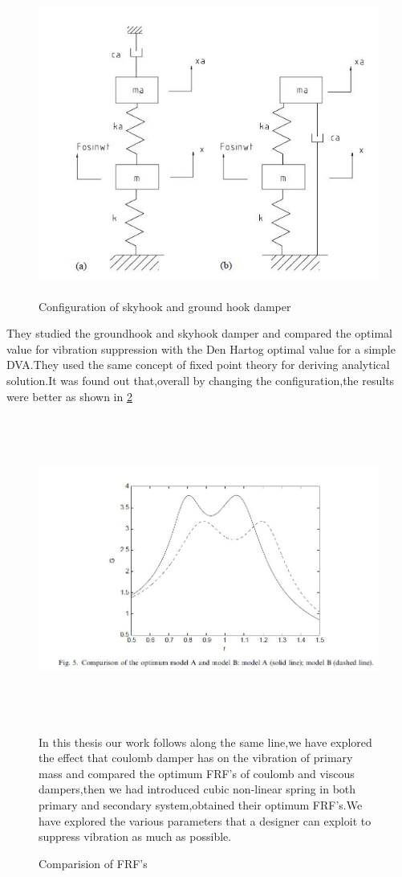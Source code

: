 \begin{figure}[h!]
\includegraphics[width=16cm,height=10cm]{"figures/8"}
\caption{Configuration of skyhook and ground hook damper}
  \label{fig:8}
\end{figure}
They studied the groundhook and skyhook damper and compared the optimal value for vibration suppression with the Den Hartog optimal value for a simple DVA.They used the same concept of fixed point theory for deriving analytical solution.It was found out that,overall by changing the configuration,the results were better as shown in \ref{fig:9}
\begin{figure}[h!]
\includegraphics[width=16cm,height=10cm]{"figures/9"}
\caption{Comparision of FRF's}
  \label{fig:9}
  In this thesis our work follows along the same line,we have explored the effect that coulomb damper has on the vibration of primary mass and compared the optimum FRF's of coulomb and viscous dampers,then we had introduced cubic non-linear spring in both primary and secondary system,obtained their optimum FRF's.We have explored the various parameters that a designer can exploit to suppress vibration as much as possible.
\end{figure}
